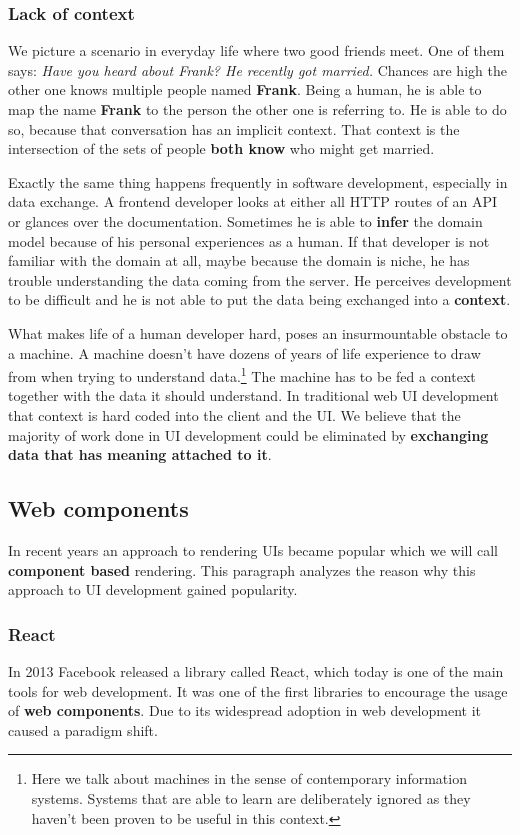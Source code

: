 \subsubsection{Lack of context}\label{datahumanmachine}
We picture a scenario in everyday life where two good friends meet. One of them says: \textit{Have you heard about Frank? He recently got married.} Chances are high the other one knows multiple people named \textbf{Frank}. Being a human, he is able to map the name \textbf{Frank} to the person the other one is referring to. He is able to do so, because that conversation has an implicit context. That context is the intersection of the sets of people \textbf{both know} who might get married.
\par Exactly the same thing happens frequently in software development, especially in data exchange. A frontend developer looks at either all HTTP routes of an API or glances over the documentation. Sometimes he is able to \textbf{infer} the domain model because of his personal experiences as a human. If that developer is not familiar with the domain at all, maybe because the domain is niche, he has trouble understanding the data coming from the server. He perceives development to be difficult and he is not able to put the data being exchanged into a \textbf{context}.
\par What makes life of a human developer hard, poses an insurmountable obstacle to a machine. A machine doesn't have dozens of years of life experience to draw from when trying to understand data.\footnote{Here we talk about machines in the sense of contemporary information systems. Systems that are able to learn are deliberately ignored as they haven't been proven to be useful in this context.} The machine has to be fed a context together with the data it should understand. In traditional web UI development that context is hard coded into the client and the UI. We believe that the majority of work done in UI development could be eliminated by \textbf{exchanging data that has meaning attached to it}.

\subsection{Web components}\label{webcomponents}
In recent years an approach to rendering UIs became popular which we will call \textbf{component based} rendering. This paragraph analyzes the reason why this approach to UI development gained popularity.

\subsubsection{React}\label{sec:react}
In 2013 Facebook released a library called React, which today is one of the main tools for web development. It was one of the first libraries to encourage the usage of \textbf{web components}. Due to its widespread adoption in web development it caused a paradigm shift.

